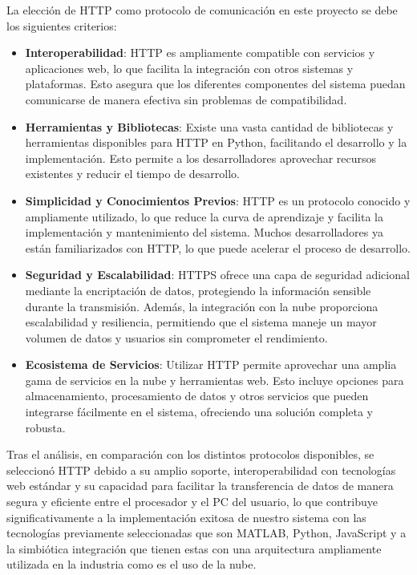 %
La elección de HTTP como protocolo de comunicación en este proyecto se debe los siguientes criterios:
%
\begin{itemize}
    \item \textbf{Interoperabilidad}: HTTP es ampliamente compatible con servicios y aplicaciones web, lo que facilita la integración con otros sistemas y plataformas. Esto asegura que los diferentes componentes del sistema puedan comunicarse de manera efectiva sin problemas de compatibilidad.
    
    \item \textbf{Herramientas y Bibliotecas}: Existe una vasta cantidad de bibliotecas y herramientas disponibles para HTTP en Python, facilitando el desarrollo y la implementación. Esto permite a los desarrolladores aprovechar recursos existentes y reducir el tiempo de desarrollo.
    
    \item \textbf{Simplicidad y Conocimientos Previos}: HTTP es un protocolo conocido y ampliamente utilizado, lo que reduce la curva de aprendizaje y facilita la implementación y mantenimiento del sistema. Muchos desarrolladores ya están familiarizados con HTTP, lo que puede acelerar el proceso de desarrollo.
    
    \item \textbf{Seguridad y Escalabilidad}: HTTPS ofrece una capa de seguridad adicional mediante la encriptación de datos, protegiendo la información sensible durante la transmisión. Además, la integración con la nube proporciona escalabilidad y resiliencia, permitiendo que el sistema maneje un mayor volumen de datos y usuarios sin comprometer el rendimiento.
    
    \item \textbf{Ecosistema de Servicios}: Utilizar HTTP permite aprovechar una amplia gama de servicios en la nube y herramientas web. Esto incluye opciones para almacenamiento, procesamiento de datos y otros servicios que pueden integrarse fácilmente en el sistema, ofreciendo una solución completa y robusta.
\end{itemize}
%
Tras el análisis, en comparación con los distintos protocolos disponibles, se seleccionó HTTP debido a su amplio soporte, interoperabilidad con tecnologías web estándar y su capacidad para facilitar la transferencia de datos de manera segura y eficiente entre el procesador y el PC del usuario, lo que contribuye significativamente a la implementación exitosa de nuestro sistema con las tecnologías previamente seleccionadas que son MATLAB, Python, JavaScript y a la simbiótica integración que tienen estas con una arquitectura ampliamente utilizada en la industria como es el uso de la nube.
%
